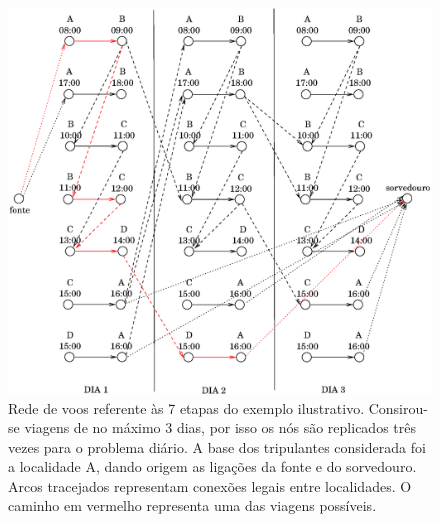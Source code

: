 \begin{figure}[htbp]
	\begin{center}
		\includegraphics[scale=0.80]{fig/rede.eps}
		\caption{Rede de voos referente às 7 etapas do exemplo ilustrativo. Consirou-se viagens de no 
		máximo 3 dias, por isso os nós são replicados três vezes para o problema diário. A base dos 
		tripulantes considerada foi a localidade A, dando origem as ligações da fonte e do sorvedouro.
		Arcos tracejados representam conexões legais entre localidades. O caminho em vermelho representa
		uma das viagens possíveis.}
		\label{fig:rede}
	\end{center}
\end{figure}

